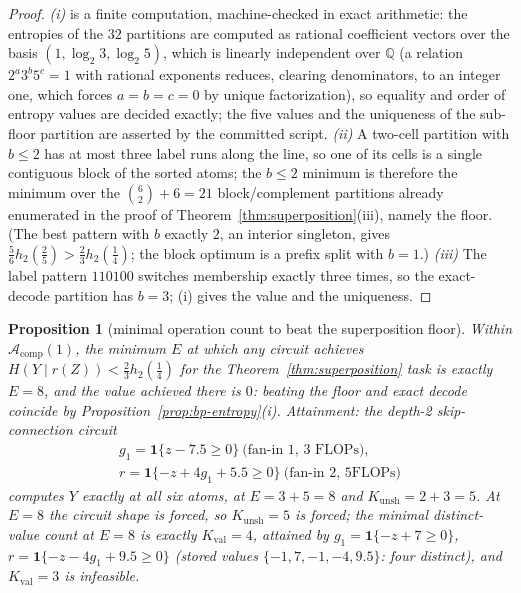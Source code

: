 \documentclass[twocolumn,10pt]{article}
\newtheorem{proposition}[theorem]{Proposition}
\theoremstyle{definition}
\theoremstyle{remark}
\newcommand{\cA}{\mathcal{A}}
\newcommand{\hb}{h_2}
\newcommand{\Kunsh}{K_{\mathrm{unsh}}}
\newcommand{\Kval}{K_{\mathrm{val}}}
\begin{document}
\begin{proof}
\emph{(i)} is a finite computation, machine-checked in exact
arithmetic: the entropies of the $32$ partitions are computed as
rational coefficient vectors over the basis $(1, \log_2 3, \log_2 5)$,
which is linearly independent over $\mathbb Q$ (a relation
$2^a 3^b 5^c = 1$ with rational exponents reduces, clearing
denominators, to an integer one, which forces $a = b = c = 0$ by
unique factorization), so equality and order of entropy values are
decided exactly; the five values and the uniqueness of the sub-floor
partition are asserted by the committed script.
\emph{(ii)} A two-cell partition with $b \le 2$ has at most three label
runs along the line, so one of its cells is a single contiguous block
of the sorted atoms; the $b \le 2$ minimum is therefore the minimum
over the $\binom62 + 6 = 21$ block/complement partitions already
enumerated in the proof of Theorem~\ref{thm:superposition}(iii),
namely the floor. (The best pattern with $b$ exactly $2$, an interior
singleton, gives $\tfrac56 \hb(\tfrac25) > \tfrac23 \hb(\tfrac14)$; the
block optimum is a prefix split with $b = 1$.)
\emph{(iii)} The label pattern $110100$ switches membership exactly
three times, so the exact-decode partition has $b = 3$; (i) gives the
value and the uniqueness.
\end{proof}

\begin{proposition}[minimal operation count to beat the superposition
floor]
\label{prop:minE-sup}
Within $\cA_{\mathrm{comp}}(1)$, the minimum $E$ at which any circuit
achieves $H(Y \mid r(Z)) < \tfrac23 \hb(\tfrac14)$ for the
Theorem~\ref{thm:superposition} task is exactly $E = 8$, and the value
achieved there is $0$: beating the floor and exact decode coincide
by Proposition~\ref{prop:bp-entropy}(i). Attainment: the depth-2
skip-connection circuit
\begin{gather*}
g_1 = \mathbf 1\{z - 7.5 \ge 0\} \ \text{(fan-in 1, $3$ FLOPs)},
\\
r = \mathbf 1\{-z + 4 g_1 + 5.5 \ge 0\} \ \text{(fan-in 2, $5$
FLOPs)}
\end{gather*}
computes $Y$ exactly at all six atoms, at $E = 3 + 5 = 8$ and
$\Kunsh = 2 + 3 = 5$. At $E = 8$ the circuit shape is forced, so
$\Kunsh = 5$ is forced; the minimal distinct-value count at $E = 8$ is
exactly $\Kval = 4$, attained by $g_1 = \mathbf 1\{-z + 7 \ge 0\}$,
$r = \mathbf 1\{-z - 4 g_1 + 9.5 \ge 0\}$ (stored values
$\{-1, 7, -1, -4, 9.5\}$: four distinct), and $\Kval = 3$ is
infeasible.
\end{proposition}
\end{document}
